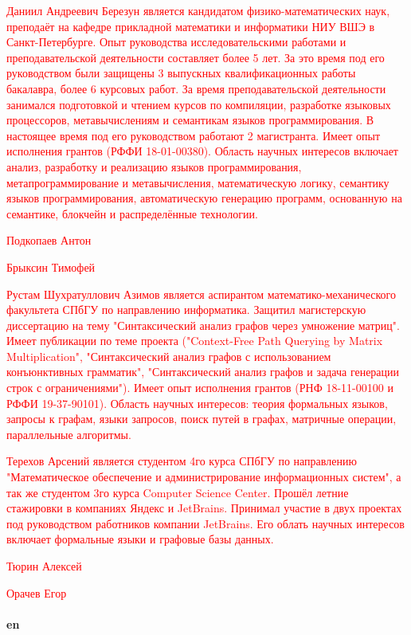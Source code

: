 \documentclass[12pt]{article}  %
\theoremstyle{remark}
\newcommand{\checkme}[1]{\textcolor{red}{#1}}
\begin{document}
\checkme{Даниил Андреевич Березун является кандидатом физико-математических наук, преподаёт на кафедре прикладной математики и информатики НИУ ВШЭ в Санкт-Петербурге. Опыт руководства исследовательскими работами и преподавательской деятельности составляет более 5 лет. За это время под его руководством были защищены 3 выпускных квалификационных работы бакалавра, более 6 курсовых работ. За время преподавательской деятельности занимался подготовкой и чтением курсов по компиляции, разработке языковых процессоров, метавычислениям и семантикам языков программирования. В настоящее время под его руководством работают 2 магистранта. Имеет опыт исполнения грантов (РФФИ 18-01-00380). Область научных интересов включает анализ, разработку и реализацию языков программирования,  метапрограммирование и метавычисления, математическую логику, семантику языков программирования, автоматическую генерацию программ, основанную на семантике, блокчейн и распределённые технологии.}

\checkme{Подкопаев Антон}

\checkme{Брыксин Тимофей}

\checkme{Рустам Шухратуллович Азимов является аспирантом математико-механического факультета СПбГУ по направлению информатика. Защитил магистерскую диссертацию на тему "Синтаксический анализ графов через умножение матриц". Имеет публикации по теме проекта ("Context-Free Path Querying by Matrix Multiplication", "Синтаксический анализ графов с использованием конъюнктивных грамматик", "Синтаксический анализ графов и задача генерации строк с ограничениями"). Имеет опыт исполнения грантов (РНФ 18-11-00100 и РФФИ 19-37-90101). Область научных интересов: теория формальных языков, запросы к графам, языки запросов, поиск путей в графах, матричные операции, параллельные алгоритмы.}

\checkme{Терехов Арсений является студентом 4го курса СПбГУ по направлению "Математическое обеспечение и администрирование информационных систем", а так же студентом 3го курса Computer Science Center. Прошёл летние стажировки в компаниях Яндекс и JetBrains. Принимал участие в двух проектах под руководством работников компании JetBrains. Его облать научных интересов включает формальные языки и графовые базы данных.}


\checkme{Тюрин Алексей}

\checkme{Орачев Егор}
\\
\\
\textbf{en}
\end{document}
